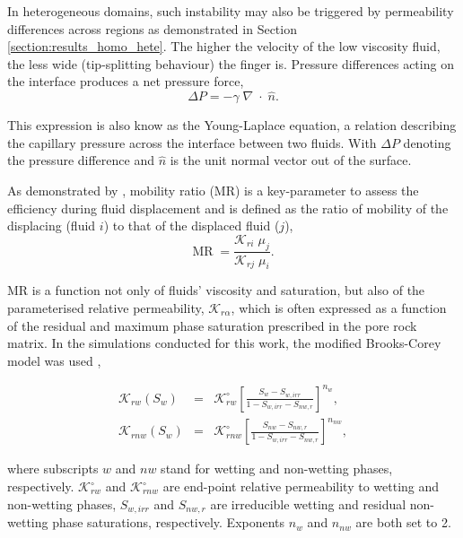 \documentclass[preprint,authoryear,12pt]{elsarticle}
\newcommand{\frc}{\displaystyle\frac}
\begin{document}
\medskip 
In heterogeneous domains, such instability may also be triggered by permeability differences across regions as demonstrated in Section \ref{section:results_homo_hete}. The higher the velocity of the low viscosity fluid, the less wide (tip-splitting behaviour) the finger is. Pressure differences acting on the interface produces a net pressure force,      
\begin{equation}
\Delta P= - \gamma \; \nabla \; \cdot \; \hat{n}. 
\label{eq:pressure_dif} 
\end{equation}

This expression is also know as the Young-Laplace equation, a relation describing the capillary pressure across the interface between two fluids. With $\Delta P$ denoting the pressure difference and $\hat{n}$ is the unit normal vector out of the surface. 

\medskip
As demonstrated by \citet{habermann_1960}, mobility ratio (MR) is a key-parameter to assess the efficiency during fluid displacement and is defined as the ratio of mobility of the displacing (fluid $i$) to that of the displaced fluid ($j$),
\begin{equation}
 \text{MR} \; = \frac{\mathcal{K}_{ri} \; \mu_{j}}{\mathcal{K}_{rj} \; \mu_{i}}. 
\label{eq:MR}
\end{equation}

MR is a function not only of fluids' viscosity and saturation, but also of the parameterised relative permeability, $\mathcal{K}_{r\alpha}$, which is often expressed as a function of the residual and maximum phase saturation prescribed in the pore rock matrix. In the simulations conducted for this work, the modified Brooks-Corey model was used \citep{alpak_1999,brooks_1964},

\begin{eqnarray}
  \mathcal{K}_{rw}\left(S_{w}\right) &=& \mathcal{K}^{\circ}_{rw}\left[\frc{S_{w}-S_{w,irr}}{1-S_{w,irr}-S_{nw,r}}\right]^{n_{w}}, \label{Eqn:CoreyBrooks1}\\
  \mathcal{K}_{rnw}\left(S_{w}\right) &=& \mathcal{K}^{\circ}_{rnw}\left[\frc{S_{nw}-S_{nw,r}}{1-S_{w,irr}-S_{nw,r}}\right]^{n_{nw}}, \label{Eqn:CoreyBrooks2}
\end{eqnarray}

where subscripts $w$ and $nw$ stand for wetting and non-wetting phases, respectively. $\mathcal{K}^{\circ}_{rw}$ and $\mathcal{K}^{\circ}_{rnw}$ are end-point relative permeability to wetting and non-wetting phases, $S_{w,irr}$ and $S_{nw,r}$ are irreducible wetting and residual non-wetting phase saturations, respectively. Exponents $n_{w}$ and $n_{nw}$ are both set to 2.
\end{document}
